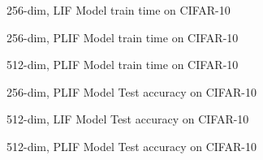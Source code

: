 \providecommand{\plotxscale}{\largeplotxscale}
\providecommand{\plotyscale}{\largeplotyscale}

\begin{figure}[t]
  \centering
  
  \caption{256-dim, LIF Model train time on CIFAR-10}
  \label{fig:lif_256_train_time}
\end{figure}

\begin{figure}[t]
  \centering
  
  \caption{256-dim, PLIF Model train time on CIFAR-10}
  \label{fig:plif_256_train_time}
\end{figure}


\begin{figure}[t]
  \centering
  
  \caption{512-dim, PLIF Model train time on CIFAR-10}
  \label{fig:plif_512_train_time}
\end{figure}


\begin{figure}[t]
  \centering
  
  \caption{256-dim, PLIF Model Test accuracy on CIFAR-10}
  \label{fig:plif_256_acc1_test}
\end{figure}

\begin{figure}[t]
  \centering
  
  \caption{512-dim, LIF Model Test accuracy on CIFAR-10}
  \label{fig:lif_512_acc1_test}
\end{figure}

\begin{figure}[t]
  \centering
  
  \caption{512-dim, PLIF Model Test accuracy on CIFAR-10}
  \label{fig:plif_512_acc1_test}
\end{figure}






